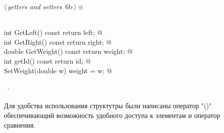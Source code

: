 \documentclass[12pt]{article}
\begin{document}
\begin{flushleft} \small
\begin{minipage}{\linewidth}\label{scrap3}\raggedright\small
{} $\langle\,${\itshape getters and setters}\nobreak\ {\footnotesize {6b}}$\,\rangle\equiv$
\vspace{-1ex}
\begin{list}{}{} \item
\mbox{}\verb@@\\
\mbox{}\verb@const int GetLeft() const { return left; }@\\
\mbox{}\verb@const int GetRight() const { return right; }@\\
\mbox{}\verb@const double GetWeight() const { return weight; }@\\
\mbox{}\verb@const int getId() const { return id; }@\\
\mbox{}\verb@void SetWeight(double w) { weight = w; }@\\
\mbox{}\verb@@{\NWsep}
\end{list}
\vspace{-1.5ex}
\footnotesize
\begin{list}{}{\setlength{\itemsep}{-\parsep}\setlength{\itemindent}{-\leftmargin}}
\item \NWtxtMacroRefIn\ .

\item{}
\end{list}
\end{minipage}\vspace{4ex}
\end{flushleft}
\paragraph{}
Для удобства использования структутры были написаны оператор "()" 
обеспечивающий возможность удобного доступа к элементам и оператор сравнения.
\end{document}
